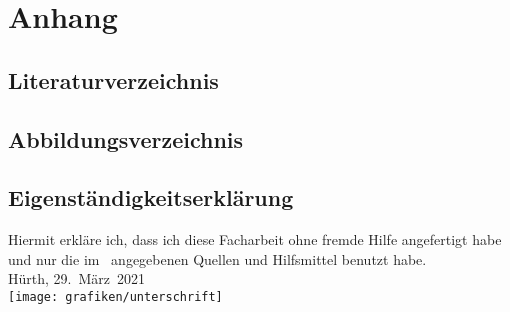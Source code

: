 \section{Anhang}\label{sec:anhang}

\subsection{Literaturverzeichnis}\label{subsec:literaturverzeichnis}
\printbibliography[heading=none]

\subsection{Abbildungsverzeichnis}\label{subsec:abbildungsverzeichnis}
\lofwithouttitle

\subsection{Eigenständigkeitserklärung}\label{subsec:eigenstandigkeitserklarung}
Hiermit erkläre ich, dass ich diese Facharbeit ohne fremde Hilfe angefertigt habe und nur die im~ angegebenen Quellen und Hilfsmittel benutzt habe.\\
\linebreak
Hürth, 29.~März~2021\\
\texttt{[image: grafiken/unterschrift]}